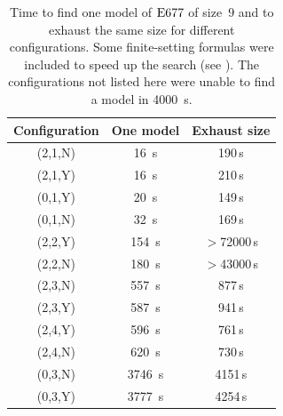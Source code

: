 \begin{table}
\caption{Time to find one model of $\Eq{677}$ of size~$9$ and to exhaust the same size for different configurations. Some finite-setting formulas were included to speed up the search (see ). The configurations not listed here were unable to find a model in \SI{4000}{s}.}
\label{table:677models}
\centering
\small
{}
\begin{tabular}{cSS}\toprule
Configuration & {One model} & {Exhaust size} \\\midrule
(2,1,N) & 16 \,\unit{s} & 190\,\unit{s} \\
(2,1,Y) & 16 \,\unit{s} & 210\,\unit{s}\\
(0,1,Y) & 20 \,\unit{s} & 149\,\unit{s}\\
(0,1,N) & 32 \,\unit{s} & 169\,\unit{s}\\
(2,2,Y) & 154 \,\unit{s} & {$>$}72000\,\unit{s} \\
(2,2,N) & 180 \,\unit{s} & {$>$}43000\,\unit{s} \\
(2,3,N) & 557 \,\unit{s} & 877\,\unit{s}\\
(2,3,Y) & 587 \,\unit{s} & 941\,\unit{s}\\
(2,4,Y) & 596 \,\unit{s} & 761\,\unit{s}\\
(2,4,N) & 620 \,\unit{s} & 730\,\unit{s}\\
(0,3,N) & 3746 \,\unit{s} & 4151\,\unit{s}\\
(0,3,Y) & 3777 \,\unit{s} & 4254\,\unit{s}\\
\bottomrule
\end{tabular}
\end{table}

